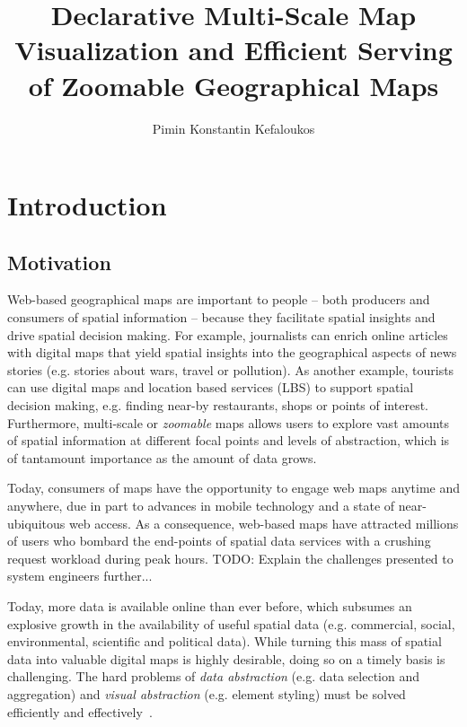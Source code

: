 \documentclass[11pt, oneside]{report}   	%
\title{Declarative Multi-Scale Map Visualization and Efficient Serving of Zoomable Geographical Maps}
\author{Pimin Konstantin Kefaloukos}
\begin{document}
\maketitle

\tableofcontents

\chapter{Introduction}


\section{Motivation}
Web-based geographical maps are important to people -- both producers and consumers of spatial information -- because they facilitate spatial insights and drive spatial decision making. For example, journalists can enrich online articles with digital maps that yield spatial insights into the geographical aspects of news stories (e.g. stories about wars, travel or pollution). As another example, tourists can use digital maps and location based services (LBS) to support spatial decision making, e.g. finding near-by restaurants, shops or points of interest. Furthermore, multi-scale or \emph{zoomable} maps allows users to explore vast amounts of spatial information at different focal points and levels of abstraction, which is of tantamount importance as the amount of data grows.

Today, consumers of maps have the opportunity to engage web maps anytime and anywhere, due in part to advances in mobile technology and a state of near-ubiquitous web access. As a consequence, web-based maps have attracted millions of users who bombard the end-points of spatial data services with a crushing request workload during peak hours. TODO: Explain the challenges presented to system engineers further...

Today, more data is available online than ever before, which subsumes an explosive growth in the availability of useful spatial data (e.g. commercial, social, environmental, scientific and political data). While turning this mass of spatial data into valuable digital maps is highly desirable, doing so on a timely basis is challenging. The hard problems of \emph{data abstraction} (e.g. data selection and aggregation) and \emph{visual abstraction} (e.g. element styling) must be solved efficiently and effectively~\cite{stolte2003multiscale,jacques1967semiologie}.
\end{document}
